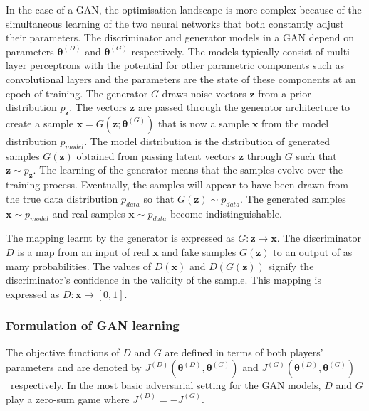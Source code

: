 \documentclass[twocolumn]{article}
\numberwithin{equation}{section}
\begin{document}
In the case of a GAN, the optimisation landscape is more complex because of the simultaneous learning of the two neural networks that both constantly adjust their parameters. The discriminator and generator models in a GAN depend on parameters $\bm{\theta}^{(D)}$ and $\bm{\theta}^{(G)}$ respectively. The models typically consist of multi-layer perceptrons with the potential for other parametric components such as convolutional layers and the parameters are the state of these components at an epoch of training. The generator $G$ draws noise vectors $\mathbf{z}$ from a prior distribution $p_{\mathbf{z}}$. The vectors $\mathbf{z}$ are passed through the generator architecture to create a sample $\mathbf{x}=G(\mathbf{z};\bm{\theta}^{(G)})$ that is now a sample $\mathbf{x}$ from the model distribution $p_{model}$. The model distribution is the distribution of generated samples $G(\mathbf{z})$ obtained from passing latent vectors $\mathbf{z}$ through $G$ such that $\mathbf{z} \sim p_{\mathbf{z}}$. The learning of the generator means that the samples evolve over the training process. Eventually, the samples will appear to have been drawn from the true data distribution $p_{data}$ so that $G(\mathbf{z}) \sim p_{data}$. The generated samples $\mathbf{x} \sim p_{model}$ and real samples $\mathbf{x} \sim p_{data}$ become indistinguishable. 

The mapping learnt by the generator is expressed as $G \! : \! \mathbf{z} \! \mapsto \! \mathbf{x}$. The discriminator $D$ is a map from an input of real $\mathbf{x}$ and fake samples $G(\mathbf{z})$ to an output of as many probabilities. The values of  $D(\mathbf{x})$ and $D(G(\mathbf{z}))$ signify the discriminator's confidence in the validity of the sample. This mapping is expressed as $D \! : \! \mathbf{x} \!  \mapsto \! [0,1]$. 

\subsubsection{Formulation of GAN learning}
The objective functions of $D$ and $G$ are defined in terms of both players' parameters and are denoted by $J^{(D)}(\bm{\theta}^{(D)}, \bm{\theta}^{(G)})$ and $J^{(G)}(\bm{\theta}^{(D)}, \bm{\theta}^{(G)})$~respectively. In the most basic adversarial setting for the GAN models, $D$ and $G$ play a zero-sum game where $J^{(D)} = - J^{(G)}$.
\end{document}
